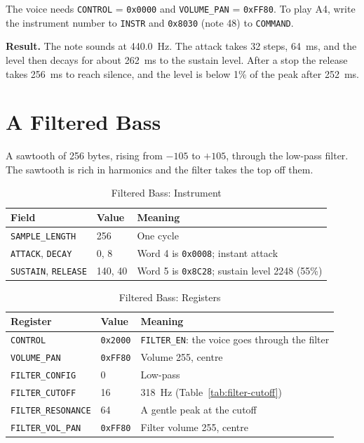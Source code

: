 The voice needs \texttt{CONTROL} = \texttt{0x0000} and \texttt{VOLUME\_PAN} = \texttt{0xFF80}. To play A4, write the
instrument number to \texttt{INSTR} and \texttt{0x8030} (note 48) to \texttt{COMMAND}.

\textbf{Result.} The note sounds at 440.0~Hz. The attack takes 32 steps, 64~ms, and the level then decays for about
262~ms to the sustain level. After a stop the release takes 256~ms to reach silence, and the level is below 1\% of the
peak after 252~ms.

\section{A Filtered Bass}

A sawtooth of 256 bytes, rising from $-105$ to $+105$, through the low-pass filter. The sawtooth is rich in harmonics
and the filter takes the top off them.

\begin{table}[H]
	\centering
	\begin{tabular}{llp{6cm}}
		\toprule
		\textbf{Field}                     & \textbf{Value} & \textbf{Meaning}                                     \\
		\midrule
		\texttt{SAMPLE\_LENGTH}            & 256            & One cycle                                            \\
		\texttt{ATTACK}, \texttt{DECAY}    & 0, 8           & Word 4 is \texttt{0x0008}; instant attack            \\
		\texttt{SUSTAIN}, \texttt{RELEASE} & 140, 40        & Word 5 is \texttt{0x8C28}; sustain level 2248 (55\%) \\
		\bottomrule
	\end{tabular}
	\caption{Filtered Bass: Instrument}
	\label{tab:ex-bass}
\end{table}

\begin{table}[H]
	\centering
	\begin{tabular}{lll}
		\toprule
		\textbf{Register}          & \textbf{Value}  & \textbf{Meaning}                                       \\
		\midrule
		\texttt{CONTROL}           & \texttt{0x2000} & \texttt{FILTER\_EN}: the voice goes through the filter \\
		\texttt{VOLUME\_PAN}       & \texttt{0xFF80} & Volume 255, centre                                     \\
		\texttt{FILTER\_CONFIG}    & 0               & Low-pass                                               \\
		\texttt{FILTER\_CUTOFF}    & 16              & 318~Hz (Table~\ref{tab:filter-cutoff})                 \\
		\texttt{FILTER\_RESONANCE} & 64              & A gentle peak at the cutoff                            \\
		\texttt{FILTER\_VOL\_PAN}  & \texttt{0xFF80} & Filter volume 255, centre                              \\
		\bottomrule
	\end{tabular}
	\caption{Filtered Bass: Registers}
	\label{tab:ex-bass-regs}
\end{table}

